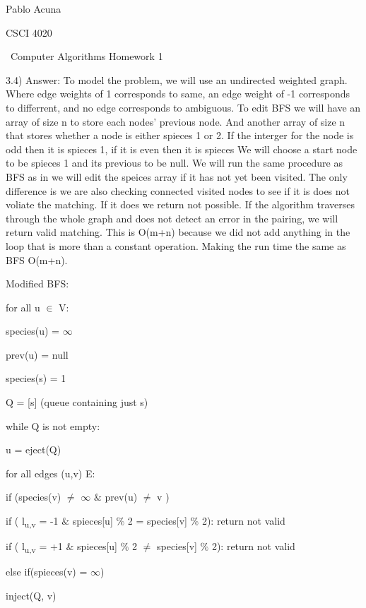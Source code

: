 \documentclass{article}
\begin{document}
Pablo Acuna

CSCI 4020


{\centering\ Computer Algorithms Homework 1 \par}


3.4) Answer: To model the problem, we will use an undirected weighted graph.  Where edge weights of 1 corresponds to same, an edge weight of -1 corresponds to differrent, and no edge corresponds to ambiguous.
To edit BFS we will have an array of size n to store each nodes' previous node.  And another array of size n that stores whether a node
is either spieces 1 or 2. If the interger for the node is odd then it is spieces 1, if it is even then it is spieces We will choose a start node to be spieces 1 and its previous to be null.
We will run the same procedure as BFS as in we will edit the speices array if it has not yet been visited.  The only difference is we are also checking connected visited nodes to see if it is does not voliate
the matching.  If it does we return not possible.  If the algorithm traverses through the whole graph and does not detect an error in the pairing, we will return valid matching.  This is O(m+n) because we did not add anything in the loop that is more than a constant operation.  Making the run time the same as BFS O(m+n).


 Modified BFS:

 for all u $\in$ V:


\indent \indent species(u) = $\infty$


\indent \indent prev(u) = null


 species(s) = 1




Q = [s] (queue containing just s)


while Q is not empty:


\indent \indent u = eject(Q)


\indent \indent for all edges (u,v)  E:


\indent \indent \indent if (species(v) $\neq$ $\infty$  $\&$ prev(u) $\neq$ v )


\indent \indent \indent \indent if (  l\textsubscript{u,v} = -1 $\&$ spieces[u] $\%$ 2 = species[v] $\%$ 2): return not valid


\indent \indent \indent \indent if (  l\textsubscript{u,v} = +1 $\&$ spieces[u] $\%$ 2 $\neq$ species[v] $\%$ 2): return not valid


 \indent \indent \indent  else if(spieces(v) = $\infty$)

 \indent \indent \indent  \indent inject(Q, v)
\end{document}
